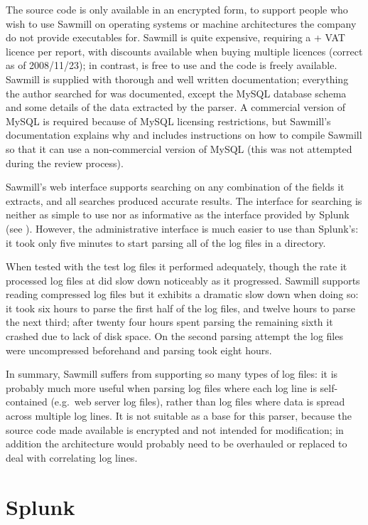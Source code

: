 The source code is only available in an encrypted form, to support people
who wish to use Sawmill on operating systems or machine architectures the
company do not provide executables for.  Sawmill is quite expensive,
requiring a  + VAT licence per report, with discounts available
when buying multiple licences (correct as of 2008/11/23); in contrast,
\parsername{} is free to use and the code is freely available.  Sawmill is
supplied with thorough and well written documentation; everything the
author searched for was documented, except the MySQL database schema and
some details of the data extracted by the parser.  A commercial version of
MySQL is required because of MySQL licensing restrictions, but Sawmill's
documentation explains why and includes instructions on how to compile
Sawmill so that it can use a non-commercial version of MySQL (this was not
attempted during the review process).

Sawmill's web interface supports searching on any combination of the fields
it extracts, and all searches produced accurate results.  The interface for
searching is neither as simple to use nor as informative as the interface
provided by Splunk (see ).  However, the
administrative interface is much easier to use than Splunk's: it took only
five minutes to start parsing all of the log files in a directory.

When tested with the \numberOFlogFILES{} test log files it performed
adequately, though the rate it processed log files at did slow down
noticeably as it progressed.  Sawmill supports reading compressed log files
but it exhibits a dramatic slow down when doing so: it took six hours to
parse the first half of the log files, and twelve hours to parse the next
third; after twenty four hours spent parsing the remaining sixth it crashed
due to lack of disk space.  On the second parsing attempt the log files
were uncompressed beforehand and parsing took eight hours.

In summary, Sawmill suffers from supporting so many types of log files: it
is probably much more useful when parsing log files where each log line is
self-contained (e.g.\ web server log files), rather than log files where
data is spread across multiple log lines.  It is not suitable as a base for
this parser, because the source code made available is encrypted and not
intended for modification; in addition the architecture would probably need
to be overhauled or replaced to deal with correlating log lines.

\section{Splunk}

